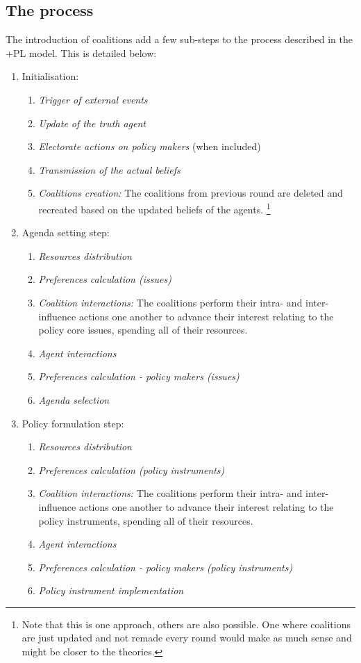 \documentclass[11pt]{article}
\begin{document}
\subsection{The process}

The introduction of coalitions add a few sub-steps to the process described in the +PL model. This is detailed below:

\begin{enumerate}
\item Initialisation:
	
	\begin{enumerate}
	\item \emph{Trigger of external events}
	\item \emph{Update of the truth agent}
	\item \emph{Electorate actions on policy makers} (when included)
	\item \emph{Transmission of the actual beliefs}
	\item \emph{Coalitions creation:} The coalitions from previous round are deleted and recreated based on the updated beliefs of the agents. \footnote{Note that this is one approach, others are also possible. One where coalitions are just updated and not remade every round would make as much sense and might be closer to the theories.}
	\end{enumerate}
	
\item Agenda setting step:
	\begin{enumerate}
	\item \emph{Resources distribution}
	\item \emph{Preferences calculation (issues)}
	\item \emph{Coalition interactions:} The coalitions perform their intra- and inter-influence actions one another to advance their interest relating to the policy core issues, spending all of their resources.
	\item \emph{Agent interactions}
	\item \emph{Preferences calculation - policy makers (issues)}
	\item \emph{Agenda selection}
	\end{enumerate}
	
\item Policy formulation step:
	\begin{enumerate}
	\item \emph{Resources distribution}
	\item \emph{Preferences calculation (policy instruments)}
	\item \emph{Coalition interactions:} The coalitions perform their intra- and inter-influence actions one another to advance their interest relating to the policy instruments, spending all of their resources.
	\item \emph{Agent interactions}
	\item \emph{Preferences calculation - policy makers (policy instruments)}
	\item \emph{Policy instrument implementation} 
	\end{enumerate}

\end{enumerate}
\end{document}
